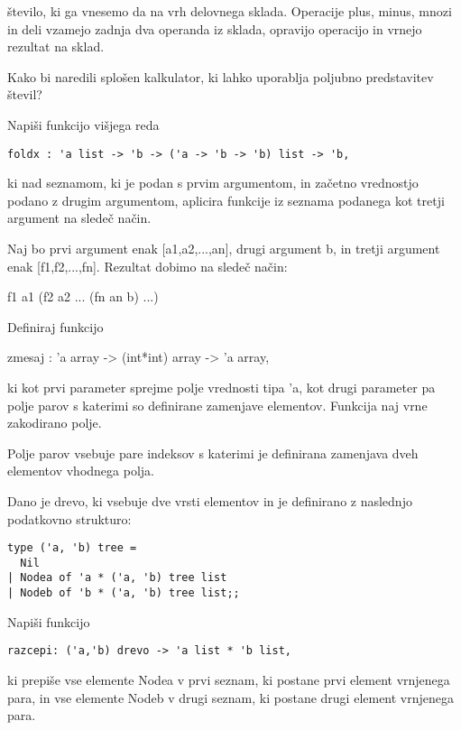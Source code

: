 \begin{ex}
\v stevilo, ki ga vnesemo da na vrh delovnega sklada. Operacije plus, minus, mnozi in deli vzamejo zadnja dva operanda iz sklada, opravijo operacijo in vrnejo rezultat na sklad. 

Kako bi naredili splo\v sen kalkulator, ki lahko uporablja poljubno predstavitev \v stevil?


\end{ex} \begin{ex}
Napi\v si funkcijo vi\v sjega reda 

\begin{verbatim}
foldx : 'a list -> 'b -> ('a -> 'b -> 'b) list -> 'b,
\end{verbatim}

ki nad seznamom, ki je podan s prvim argumentom, in za\v cetno vrednostjo podano z drugim argumentom, aplicira funkcije iz seznama podanega kot tretji argument na slede\v c na\v cin. 

Naj bo prvi argument enak [a1,a2,...,an], drugi argument b, in tretji argument enak [f1,f2,...,fn]. Rezultat dobimo na slede\v c na\v cin: 

f1 a1  (f2 a2 ... (fn  an b) ...)


\end{ex} \begin{ex}
Definiraj funkcijo 

zmesaj : 'a array -> (int*int) array -> 'a array, 

ki kot prvi parameter sprejme polje vrednosti tipa 'a, kot drugi parameter pa polje parov s katerimi so definirane zamenjave elementov. Funkcija naj vrne zakodirano polje. 

Polje parov vsebuje pare indeksov s katerimi je definirana zamenjava dveh elementov vhodnega polja. 


\end{ex} \begin{ex}
Dano je drevo, ki vsebuje dve vrsti elementov in je definirano z naslednjo podatkovno strukturo: 

\begin{verbatim}
type ('a, 'b) tree = 
  Nil
| Nodea of 'a * ('a, 'b) tree list 
| Nodeb of 'b * ('a, 'b) tree list;; 

\end{verbatim}
Napi\v si funkcijo 

\begin{verbatim}
razcepi: ('a,'b) drevo -> 'a list * 'b list, 
\end{verbatim}

ki prepi\v se vse elemente Nodea v prvi seznam, ki postane prvi element vrnjenega para, in vse elemente Nodeb v drugi seznam, ki postane drugi element vrnjenega para.



\end{ex}
